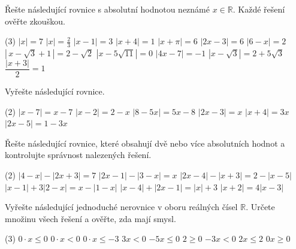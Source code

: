 \documentclass[12pt,a4paper]{article}
\begin{document}
\setcounter{section}{2}
\begin{exercise}
  Řešte následující rovnice s absolutní hodnotou neznámé \(x \in \mathbb{R}\). 
  Každé řešení ověřte zkouškou.
  \begin{tasks}(3)
    \task \(|x| = 7\)
    \task \(|x| = \tfrac{2}{3}\)
    \task \(|x - 1| = 3\)
    \task \(|x + 4| = 1\)
    \task \(|x + \pi| = 6\)
    \task \(|2x - 3| = 6\)
    \task \(|6 - x| = 2\)
    \task \(|\,x - \sqrt{3} + 1\,| = 2 - \sqrt{2}\)
    \task \(|x - 5\sqrt{11}| = 0\)
    \task \(|4x - 7| = -1\)
    \task $|x - \sqrt{3}| = 2 + 5\sqrt{3}$
    \task $\dfrac{|x+3|}{2}=1$
  \end{tasks}
\end{exercise}


\begin{exercise}
  Vyřešte následující rovnice.
  \begin{tasks}(2)
    \task \(|x - 7| = x - 7\)
    \task \(|x - 2| = 2 - x\)
    \task \(|8 - 5x| = 5x - 8\)
    \task \(|2x - 3| = x\)
    \task $|x + 4| = 3x$
    \task \(|2x - 5| = 1 - 3x\)
  \end{tasks}
\end{exercise}


\begin{exercise}
  Řešte následující rovnice, které obsahují dvě nebo více absolutních hodnot a kontrolujte správnost nalezených řešení.
  \begin{tasks}(2)
    \task \(|4 - x| - |2x + 3| = 7\)
    \task $|2x - 1| - |3 - x| = x$
    \task \(|2x - 4| - |x + 3| = 2 - |x - 5|\)
    \task \(|x - 1| + 3|2 - x| = x - |1 - x|\)
    \task \(|x - 4| + |2x - 1| = |x| + 3\)
    \task \(|x + 2| = 4|x - 3|\)
  \end{tasks}
\end{exercise}

\setcounter{section}{3}
\begin{exercise}
  Vyřešte následující jednoduché nerovnice v oboru reálných čísel \(\mathbb{R}\).  
  Určete množinu všech řešení a ověřte, zda mají smysl.
  \begin{tasks}(3)
    \task \(0\cdot x \le 0\)
    \task \(0\cdot x < 0\)
    \task \(0\cdot x \le -3\)
    \task \(3x < 0\)
    \task \(-5x \le 0\)
    \task $2 \ge 0$
    \task $-3x < 0$
    \task $2x \le 2$
    \task $0x \ge 0$
  \end{tasks}
\end{exercise}
\end{document}
